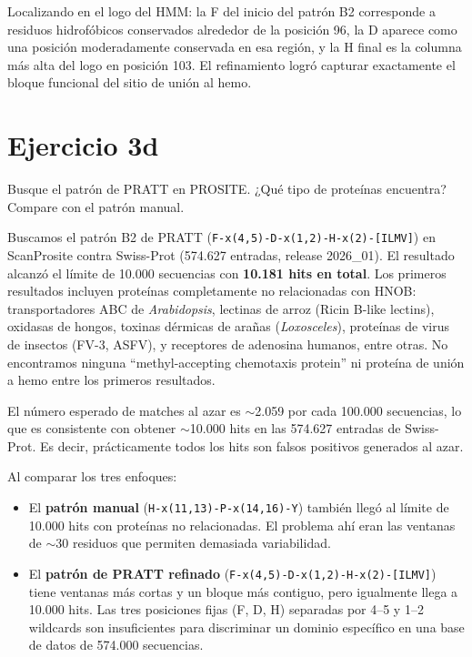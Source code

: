 Localizando en el logo del HMM: la F del inicio del patrón B2 corresponde a residuos
hidrofóbicos conservados alrededor de la posición 96, la D aparece como una posición
moderadamente conservada en esa región, y la H final es la columna más alta del logo en
posición 103. El refinamiento logró capturar exactamente el bloque funcional del sitio de
unión al hemo.

\section{Ejercicio 3d}

\begin{consigna}
Busque el patrón de PRATT en PROSITE. ¿Qué tipo de proteínas encuentra? Compare con el patrón
manual.
\end{consigna}

Buscamos el patrón B2 de PRATT (\texttt{F-x(4,5)-D-x(1,2)-H-x(2)-[ILMV]}) en ScanProsite
contra Swiss-Prot (574.627 entradas, release 2026\_01). El resultado alcanzó el límite de
10.000 secuencias con \textbf{10.181 hits en total}. Los primeros resultados incluyen proteínas
completamente no relacionadas con HNOB: transportadores ABC de \textit{Arabidopsis}, lectinas
de arroz (Ricin B-like lectins), oxidasas de hongos, toxinas dérmicas de arañas
(\textit{Loxosceles}), proteínas de virus de insectos (FV-3, ASFV), y receptores de adenosina
humanos, entre otras. No encontramos ninguna ``methyl-accepting chemotaxis protein'' ni proteína
de unión a hemo entre los primeros resultados.

El número esperado de matches al azar es $\sim$2.059 por cada 100.000 secuencias, lo que
es consistente con obtener $\sim$10.000 hits en las 574.627 entradas de Swiss-Prot. Es decir,
prácticamente todos los hits son falsos positivos generados al azar.

Al comparar los tres enfoques:

\begin{itemize}
  \item El \textbf{patrón manual} (\texttt{H-x(11,13)-P-x(14,16)-Y}) también llegó al límite
        de 10.000 hits con proteínas no relacionadas. El problema ahí eran las ventanas de
        $\sim$30 residuos que permiten demasiada variabilidad.

  \item El \textbf{patrón de PRATT refinado} (\texttt{F-x(4,5)-D-x(1,2)-H-x(2)-[ILMV]}) tiene
        ventanas más cortas y un bloque más contiguo, pero igualmente llega a 10.000 hits. Las
        tres posiciones fijas (F, D, H) separadas por 4--5 y 1--2 wildcards son insuficientes
        para discriminar un dominio específico en una base de datos de 574.000 secuencias.
\end{itemize}

